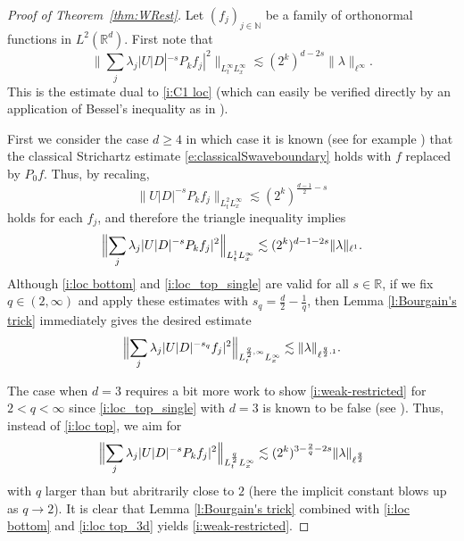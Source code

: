 \documentclass[a4paper]{amsart}
\numberwithin{equation}{section}%
\theoremstyle{plain}%
\theoremstyle{definition}
\theoremstyle{remark}%
\newcommand{\R}{{\mathbb R}}
\newcommand{\N}{{\mathbb N}}
\begin{document}
\begin{proof}[Proof of Theorem~\ref{thm:WRest}]
Let $(f_j)_{j \in \N}$ be a family of orthonormal functions in $L^2(\R^d)$. First note that
\begin{equation}\label{i:loc bottom}
\Big\|\sum_j\lambda_j|U |D|^{-s} P_kf_j|^2\Bigr\|_{L_t^\infty L_x^\infty}
\lesssim
(2^k)^{d-2s}
\|\lambda\|_{\ell^\infty}.
\end{equation}
This is the estimate dual to \eqref{i:C1 loc} (which can easily be verified directly by an application of Bessel's inequality as in \cite{BHLNS}).

First we consider the case $d\geq 4$ in which case it is known (see for example \cite[Theorem 1]{FangWang}) that the classical Strichartz estimate \eqref{e:classicalSwaveboundary} holds with $f$ replaced by $P_0f$. Thus, by recaling, 
\begin{equation}
\label{i:loc_top_single}
    \| U|D|^{-s}P_kf_j \|_{L_t^2L_x^\infty}
\lesssim
(2^k)^{\frac{d-1}{2}-s}
\end{equation}
holds for each $f_j$, and therefore the triangle inequality implies
\begin{equation}\label{i:loc top}
\Bigl\|\sum_j \lambda_j|U|D|^{-s}P_kf_j|^2\Bigr\|_{L_t^1L_x^\infty}
\lesssim
(2^k)^{d-1-2s}
\|\lambda\|_{\ell^1}.
\end{equation}
Although \eqref{i:loc bottom} and \eqref{i:loc_top_single} are valid for all $s \in \mathbb{R}$, if we fix $q\in(2,\infty)$ and apply these estimates with $s_q=\frac d2-\frac1q$, then Lemma \ref{l:Bourgain's trick} immediately gives the desired estimate 
\[
\Bigl\|\sum_j\lambda_j|U|D|^{-s_q}f_j|^2\Bigr\|_{L_t^{\frac q2,\infty}L_x^\infty}
\lesssim 
\|\lambda\|_{\ell^{\frac q2,1}}.
\]

The case when $d=3$ requires a bit more work to show \eqref{i:weak-restricted} for $2<q<\infty$ since \eqref{i:loc_top_single} with $d=3$ is known to be false (see \cite{MontSmith}). 
Thus, instead of \eqref{i:loc top}, we aim for
\begin{equation}\label{i:loc top_3d}
\Bigl\|\sum_j \lambda_j|U|D|^{-s}P_kf_j|^2\Bigr\|_{L_t^{\frac{q}{2}} L_x^\infty}
\lesssim
(2^k)^{3-\frac2q -2s}
\|\lambda\|_{\ell^{\frac{q}{2}}}
\end{equation}
with $q$ larger than but abritrarily close to $2$ (here the implicit constant blows up as $q \to 2$). It is clear that Lemma \ref{l:Bourgain's trick} combined with \eqref{i:loc bottom} and \eqref{i:loc top_3d} yields \eqref{i:weak-restricted}. 


\end{proof}
\end{document}
